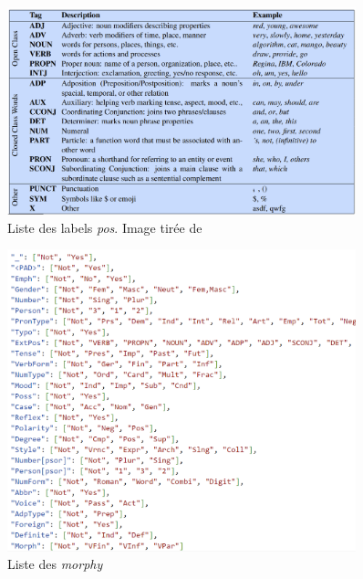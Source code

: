 \documentclass[a4paper]{article}
\begin{document}
\begin{figure}[H]
    \centering
    \includegraphics[width=0.9\textwidth]{all_pos.png}
    \caption{Liste des labels \textit{pos}. Image tirée de~\cite{pos}}
    \label{fig: all pos}
\end{figure}   

\begin{figure}[H]
    \centering
    \includegraphics[width=0.9\textwidth]{all_morphy.png}
    \caption{Liste des \textit{morphy}}
    \label{fig: all morphy}
\end{figure}  

\bigskip
\printbibliography
\end{document}
